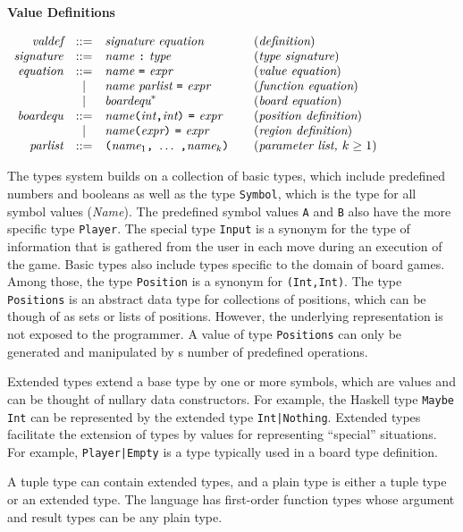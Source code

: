 \documentclass[11pt]{article}
\makeatletter
\newcommand{\prodName}[1]{&(\emph{#1})\\}
\newcommand{\nt}[1]{\textit{#1}}
\newcommand{\prog}[1]{\texttt{#1}}
\newcommand{\IS}{&::=&}
\newcommand{\OR}{&|&}
\newcommand{\syntax}[2]{
  \needspace{3\baselineskip}
  \bigskip\par\noindent\textbf{#1}\par\smallskip%
  $\begin{array}{rcl@{\qquad}l}#2\end{array}$%
  \par\bigskip\noindent\ignorespaces
}
\newcommand{\lp}{\prog{(}}
\newcommand{\rp}{\prog{)}}
\newcommand{\paren}[1]{\lp#1\rp}
\newcommand{\pair}[2]{\paren{#1\prog{,}#2}}
\makeatother
\begin{document}
\syntax{Value Definitions}{
\nt{valdef}    \IS \nt{signature}\ \nt{equation}   \prodName{definition}
\nt{signature} \IS \nt{name}\ \prog{:}\ \nt{type}  \prodName{type signature}
\nt{equation}  \IS \nt{name}\ \prog{=}\ \nt{expr}  \prodName{value equation}
               \OR \nt{name}\ \nt{parlist}\ \prog{=}\ \nt{expr}
                   \prodName{function equation}
               \OR \nt{boardequ}^*                  \prodName{board equation}
\nt{boardequ}  \IS \nt{name}\pair{\nt{int}}{\nt{int}}\ \prog{=}\ \nt{expr}
                   \prodName{position definition}
               \OR \nt{name}\paren{\nt{expr}}\ \prog{=}\ \nt{expr}
                   \prodName{region definition}
\nt{parlist} \IS \paren{\nt{name}_1\prog{,}\ \ldots\ \prog{,}\nt{name}_k}
                 \prodName{parameter list, $k\geq 1$}
}
%
The types system builds on a collection of basic types, which include
predefined numbers and booleans as well as the type \prog{Symbol}, which is the
type for all symbol values (\nt{Name}). The predefined symbol values \prog{A}
and \prog{B} also have the more specific type \prog{Player}. The special type
\prog{Input} is a synonym for the type of information that is gathered from the
user in each move during an execution of the game.
%
Basic types also include types specific to the domain of board games. Among
those, the type \prog{Position} is a synonym for \prog{(Int,Int)}. The type
\prog{Positions} is an abstract data type for collections of positions, which
can be though of as sets or lists of positions. However, the underlying
representation is not exposed to the programmer. A value of type
\prog{Positions} can only be generated and manipulated by s number of
predefined operations.

Extended types extend a base type by one or more symbols, which are values and
can be thought of nullary data constructors. For example, the Haskell type
\prog{Maybe Int} can be represented by the extended type \prog{Int|Nothing}.
Extended types facilitate the extension of types by values for representing
``special'' situations. For example, \prog{Player|Empty} is a type typically
used in a board type definition.

A tuple type can contain extended types, and a plain type is either a tuple
type or an extended type. The language has first-order function types whose
argument and result types can be any plain type.
\end{document}

